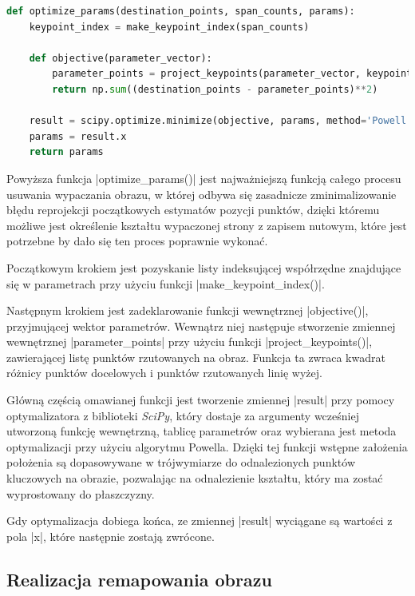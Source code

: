 \begin{lstlisting}[caption={\pyth|optimize_params()| - funkcja optymalizucjąca parametry modelu}, label={optimize-params}, language=Python]
def optimize_params(destination_points, span_counts, params):
	keypoint_index = make_keypoint_index(span_counts)
	
	def objective(parameter_vector):
		parameter_points = project_keypoints(parameter_vector, keypoint_index)
		return np.sum((destination_points - parameter_points)**2)
	
	result = scipy.optimize.minimize(objective, params, method='Powell')
	params = result.x
	return params
\end{lstlisting}

Powyższa funkcja \pyth|optimize_params()| jest najważniejszą funkcją całego procesu usuwania wypaczania obrazu, w której odbywa się zasadnicze zminimalizowanie błędu reprojekcji początkowych estymatów pozycji punktów, dzięki któremu możliwe jest określenie kształtu wypaczonej strony z zapisem nutowym, które jest potrzebne by dało się ten proces poprawnie wykonać.

Początkowym krokiem jest pozyskanie listy indeksującej współrzędne znajdujące się w parametrach przy użyciu funkcji \pyth|make_keypoint_index()|. 

Następnym krokiem jest zadeklarowanie funkcji wewnętrznej \pyth|objective()|, przyjmującej wektor parametrów. Wewnątrz niej następuje stworzenie zmiennej wewnętrznej \pyth|parameter_points| przy użyciu funkcji \pyth|project_keypoints()|, zawierającej listę punktów rzutowanych na obraz. Funkcja ta zwraca kwadrat różnicy punktów docelowych i punktów rzutowanych linię wyżej.

Główną częścią omawianej funkcji jest tworzenie zmiennej \pyth|result| przy pomocy optymalizatora z biblioteki \textit{SciPy}, który dostaje za argumenty wcześniej utworzoną funkcję wewnętrzną, tablicę parametrów oraz wybierana jest metoda optymalizacji przy użyciu algorytmu Powella. Dzięki tej funkcji wstępne założenia położenia są dopasowywane w trójwymiarze do odnalezionych punktów kluczowych na obrazie, pozwalając na odnalezienie kształtu, który ma zostać wyprostowany do płaszczyzny. 

Gdy optymalizacja dobiega końca, ze zmiennej \pyth|result| wyciągane są wartości z pola \pyth|x|, które następnie zostają zwrócone.



\subsection{Realizacja remapowania obrazu}


